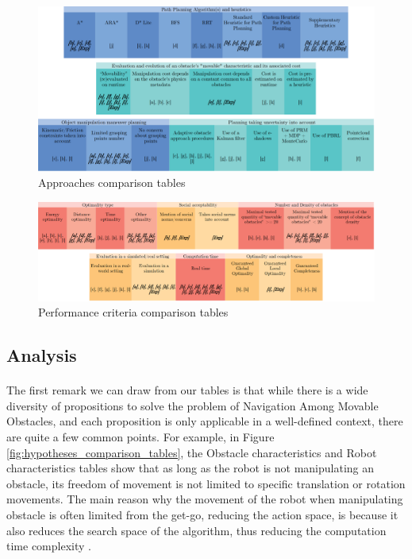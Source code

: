 \begin{figure}[H]
\centering
\includegraphics[width=\linewidth]{Comparison_Table/b_approaches}
\decoRule
\caption[Approaches comparison tables]{Approaches comparison tables}
\label{fig:approaches_comparison_tables}
\end{figure}

\begin{figure}[H]
\centering
\includegraphics[width=\linewidth]{Comparison_Table/c_performance}
\decoRule
\caption[Performance criteria comparison tables]{Performance criteria comparison tables}
\label{fig:performance_comparison_tables}
\end{figure}

\subsection{Analysis}

\paragraph{} The first remark we can draw from our tables is that while there is a wide diversity of propositions to solve the problem of Navigation Among Movable Obstacles, and each proposition is only applicable in a well-defined context, there are quite a few common points. For example, in Figure \ref{fig:hypotheses_comparison_tables}, the Obstacle characteristics and Robot characteristics tables show that as long as the robot is not manipulating an obstacle, its freedom of movement is not limited to specific translation or rotation movements. The main reason why the movement of the robot when manipulating obstacle is often limited from the get-go, reducing the action space, is because it also reduces the search space of the algorithm, thus reducing the computation time complexity \parencite{stilman_navigation_2005}.

